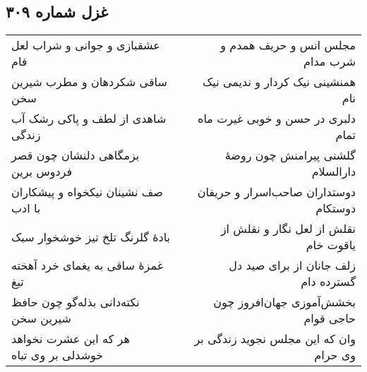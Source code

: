 \begin{center}
\section*{غزل شماره ۳۰۹}
\label{sec:sh309}
\begin{longtable}{l p{0.5cm} r}
عشقبازی و جوانی و شراب لعل فام
&&
مجلس انس و حریف همدم و شرب مدام
\\
ساقی شکردهان و مطرب شیرین سخن
&&
همنشینی نیک کردار و ندیمی نیک نام
\\
شاهدی از لطف و پاکی رشک آب زندگی
&&
دلبری در حسن و خوبی غیرت ماه تمام
\\
بزمگاهی دلنشان چون قصر فردوس برین
&&
گلشنی پیرامنش چون روضهٔ دارالسلام
\\
صف نشینان نیکخواه و پیشکاران با ادب
&&
دوستداران صاحب‌اسرار و حریفان دوستکام
\\
بادهٔ گلرنگ تلخ تیز خوشخوار سبک
&&
نقلش از لعل نگار و نقلش از یاقوت خام
\\
غمزهٔ ساقی به یغمای خرد آهخته تیغ
&&
زلف جانان از برای صید دل گسترده دام
\\
نکته‌دانی بذله‌گو چون حافظ شیرین سخن
&&
بخشش‌آموزی جهان‌افروز چون حاجی قوام
\\
هر که این عشرت نخواهد خوشدلی بر وی تباه
&&
وان که این مجلس نجوید زندگی بر وی حرام
\\
\end{longtable}
\end{center}
